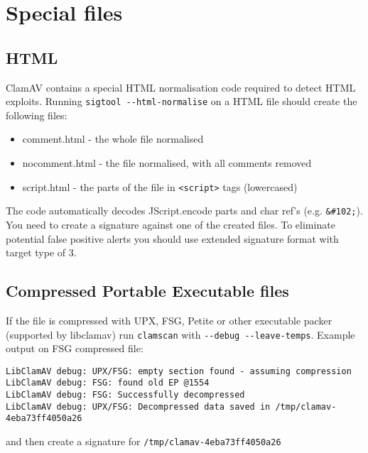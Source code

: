\documentclass[a4paper,titlepage,12pt]{article}
\begin{document}
    \section{Special files}

    \subsection{HTML}
    ClamAV contains a special HTML normalisation code required to detect
    HTML exploits. Running \verb+sigtool --html-normalise+ on a HTML file
    should create the following files:
    \begin{itemize}
	\item comment.html - the whole file normalised
	\item nocomment.html - the file normalised, with all comments removed
	\item script.html - the parts of the file in \verb+<script>+ tags
	      (lowercased)
    \end{itemize}
    The code automatically decodes JScript.encode parts and char ref's (e.g.
    \verb+&#102;+). You need to create a signature against one of the created
    files. To eliminate potential false positive alerts you should use
    extended signature format with target type of 3.

    \subsection{Compressed Portable Executable files}
    If the file is compressed with UPX, FSG, Petite or other executable packer
    (supported by libclamav) run \verb+clamscan+ with
    \verb+--debug --leave-temps+. Example output on FSG compressed file:
    \begin{verbatim}
LibClamAV debug: UPX/FSG: empty section found - assuming compression
LibClamAV debug: FSG: found old EP @1554
LibClamAV debug: FSG: Successfully decompressed
LibClamAV debug: UPX/FSG: Decompressed data saved in /tmp/clamav-4eba73ff4050a26
    \end{verbatim}
    and then create a signature for \verb+/tmp/clamav-4eba73ff4050a26+
\end{document}
